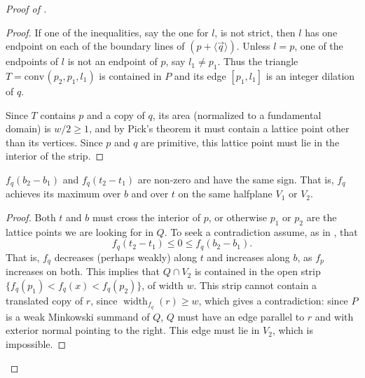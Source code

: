 \documentclass[12pt]{article}
\newcommand{\width}{\operatorname{width}}
\newcommand{\conv}{\ensuremath{\mathrm{conv}}\hspace{1pt}}
\newcommand{\vecline}[1]{\langle \vec #1 \rangle}
\begin{document}
\begin{proof}[Proof of ]
\begin{proof}
If one of the inequalities, say the one for $l$, is not strict, then $l$ has one endpoint on each of the boundary lines of $(p + \vecline q)$. Unless $l = p$, one of the endpoints of $l$ is not an endpoint of $p$, say $l_1 \neq p_1$. Thus the triangle $T=\conv(p_2, p_1, l_1)$ is contained in $P$ and its edge $[p_1, l_1]$ is an integer dilation of $q$. 

Since $T$ contains $p$ and a copy of $q$, its area (normalized to a fundamental domain) is $w/2 \geq 1$, and by Pick's theorem it must contain a lattice point other than its vertices. Since $p$ and $q$ are primitive, this lattice point must lie in the interior of the strip.
\end{proof}


\begin{claim}
\label{claim:b_and_t}
$f_q(b_2-b_1)$ and $f_q(t_2 - t_1)$ are non-zero and have the same sign. That is, $f_q$ achieves its maximum over $b$ and over $t$ on the same halfplane $V_1$ or $V_2$.
\end{claim}

\begin{proof}
Both $t$ and $b$ must cross the interior of $p$, or otherwise $p_1$ or $p_2$ are the lattice points we are looking for in $Q$.
To seek a contradiction assume, as in , that 
\[
f_q(t_2 - t_1) \le 0 \le f_q(b_2-b_1).
\]
That is, $f_q$ decreases (perhaps weakly) along $t$ and increases along $b$, as $f_p$ increases on both. This implies that $Q \cap V_2$ is contained in the open strip $\{f_q(p_1) <f_q(x)< f_q(p_2)\}$, of width $w$.
%
%
%
%
%
%
%
%
%
%	
This strip cannot contain a translated copy of $r$, since $\width_{f_q}(r) \geq w$, which gives a contradiction: since $P$ is a weak Minkowski summand of $Q$, $Q$ must have an edge parallel to $r$ and with exterior normal pointing to the right. This edge must lie in $V_2$, which is impossible.
\end{proof}


\end{proof}
\end{document}

